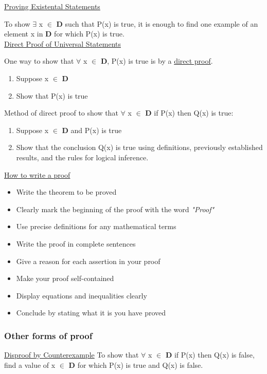 \documentclass{article}
\begin{document}
\underline{Proving Existental Statements}

To show $\exists$ x $\in$ \textbf{D} such that P(x) is true, it is enough to find one example of an element x in \textbf{D} for which P(x) is true. \\

\underline{Direct Proof of Universal Statements}

One way to show that $\forall$ x $\in$ \textbf{D}, P(x) is true is by a \underline{direct proof}.

\begin{enumerate}
\item Suppose x $\in$ \textbf{D}
\item Show that P(x) is true
\end{enumerate}

Method of direct proof to show that $\forall$ x $\in$ \textbf{D} if P(x) then Q(x) is true:
\begin{enumerate}
\item Suppose x $\in$ \textbf{D} and P(x) is true
\item Show that the conclusion Q(x) is true using definitions, previously established results, and the rules for logical inference.
\end{enumerate}

\underline{How to write a proof}

\begin{itemize}
\item Write the theorem to be proved
\item Clearly mark the beginning of the proof with the word \textit{"Proof"}
\item Use precise definitions for any mathematical terms
\item Write the proof in complete sentences
\item Give a reason for each assertion in your proof
\item Make your proof self-contained
\item Display equations and inequalities clearly
\item Conclude by stating what it is you have proved
\end{itemize}

\subsubsection{Other forms of proof}

\underline{Disproof by Counterexample}
To show that $\forall$ x $\in$ \textbf{D} if P(x) then Q(x) is false, find a value of x $\in$ \textbf{D} for which P(x) is true and Q(x) is false. \\ \\ 
\end{document}
